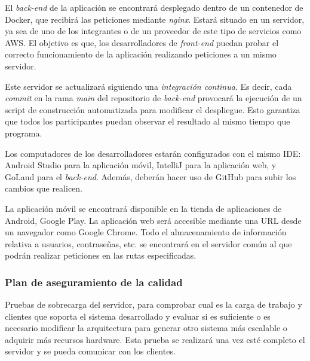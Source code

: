 \documentclass{article}
\begin{document}

El \textit{back-end} de la aplicación se encontrará desplegado dentro de un contenedor de Docker, que recibirá las peticiones mediante \emph{nginx}. Estará situado en un servidor, ya sea de uno de los integrantes o de un proveedor de este tipo de servicios como AWS. El objetivo es que, los desarrolladores de \textit{front-end} puedan probar el correcto funcionamiento de la aplicación realizando peticiones a un mismo servidor.

Este servidor se actualizará siguiendo una \emph{integración continua}. Es decir, cada \textit{commit} en la rama \textit{main} del repositorio de \textit{back-end} provocará la ejecución de un script de construcción automatizada para modificar el despliegue. Esto garantiza que todos los participantes puedan observar el resultado al mismo tiempo que programa.

Los computadores de los desarrolladores estarán configurados con el mismo IDE: Android Studio para la aplicación móvil, IntelliJ para la aplicación web, y GoLand para el \textit{back-end}. Además, deberán hacer uso de GitHub para subir los cambios que realicen.

La aplicación móvil se encontrará disponible en la tienda de aplicaciones de Android, Google Play. La aplicación web será accesible mediante una URL desde un navegador como Google Chrome. Todo el almacenamiento de información relativa a usuarios, contraseñas, etc. se encontrará en el servidor común al que podrán realizar peticiones en las rutas especificadas.


\subsubsection{Plan de aseguramiento de la calidad}

Pruebas de sobrecarga del servidor, para comprobar cual es la carga de trabajo y clientes que soporta el sistema desarrollado y evaluar si es suficiente o es necesario modificar la arquitectura para generar otro sistema más escalable o adquirir más recursos hardware. Esta prueba se realizará una vez esté completo el servidor y se pueda comunicar con los clientes.
\end{document}
